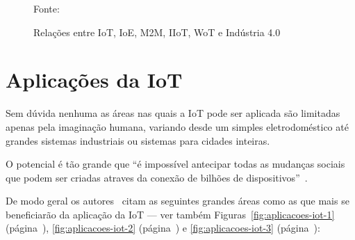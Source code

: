 \documentclass[pdftex, brazil, 12pt, twoside]{article}
\begin{document}
\begin{figure}[H]
  \begin{center}
    \caption{Relações entre IoT, IoE, M2M, IIoT, WoT e Indústria 4.0}
    \label{fig:outras-iot}
    
    \footnotesize{Fonte:~\citet{LuethIoT2014}}
  \end{center}
\end{figure}


\section{Aplicações da IoT}
\label{aplicacoes-iot}

Sem dúvida nenhuma as áreas nas quais a IoT pode ser aplicada são limitadas apenas
pela imaginação humana, variando desde um simples eletrodoméstico até grandes
sistemas industriais ou sistemas para cidades inteiras.

O potencial é tão grande que ``é impossível antecipar
todas as mudanças sociais que podem ser criadas atraves da conexão de bilhões
de dispositivos''~\citep[][p.\ 18]{UKGOSWalportIoT2014}.

De modo geral os autores~\citep{OliverWymanIoT2015,UKGOSWalportIoT2014,IEEEIoTReport,IEEEIoTDefinition,ChuiIoT2010,BughinExecutiveIoT2015,GuptaMcKinseyIoT2017,McKinseyIoTHype,SAPFutureIoT,SASIoTUseCases2016} citam as seguintes grandes
áreas como as que mais se beneficiarão da aplicação da IoT --- ver também
Figuras~\ref{fig:aplicacoes-iot-1} (página~\pageref{fig:aplicacoes-iot-1}), \ref{fig:aplicacoes-iot-2}
(página~\pageref{fig:aplicacoes-iot-2}) e \ref{fig:aplicacoes-iot-3} (página~\pageref{fig:aplicacoes-iot-3}):
\end{document}
